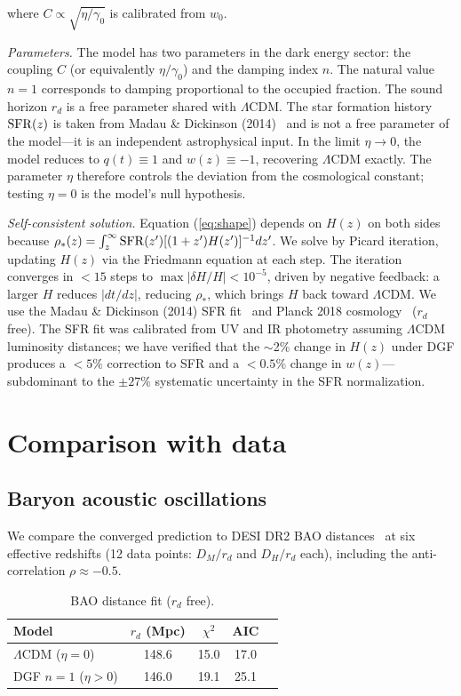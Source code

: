\documentclass[12pt,a4paper]{article}
\begin{document}
where $C\propto\sqrt{\eta/\gamma_0}$ is calibrated from $w_0$.

{\it Parameters.} The model has two parameters in the dark energy sector: the coupling $C$ (or equivalently $\eta/\gamma_0$) and the damping index $n$. The natural value $n=1$ corresponds to damping proportional to the occupied fraction. The sound horizon $r_d$ is a free parameter shared with $\Lambda$CDM. The star formation history ${\rm SFR}(z)$ is taken from Madau \& Dickinson (2014)~\cite{madau2014} and is not a free parameter of the model---it is an independent astrophysical input. In the limit $\eta\to0$, the model reduces to $q(t)\equiv1$ and $w(z)\equiv-1$, recovering $\Lambda$CDM exactly. The parameter $\eta$ therefore controls the deviation from the cosmological constant; testing $\eta=0$ is the model's null hypothesis.

{\it Self-consistent solution.} Equation (\ref{eq:shape}) depends on $H(z)$ on both sides because $\rho_*(z)=\int_z^\infty{\rm SFR}(z')[(1+z')H(z')]^{-1}dz'$. We solve by Picard iteration, updating $H(z)$ via the Friedmann equation at each step. The iteration converges in $<15$ steps to $\max|\delta H/H|<10^{-5}$, driven by negative feedback: a larger $H$ reduces $|dt/dz|$, reducing $\rho_*$, which brings $H$ back toward $\Lambda$CDM. We use the Madau \& Dickinson (2014) SFR fit~\cite{madau2014} and Planck 2018 cosmology~\cite{planck2018} ($r_d$ free). The SFR fit was calibrated from UV and IR photometry assuming $\Lambda$CDM luminosity distances; we have verified that the $\sim$2\% change in $H(z)$ under DGF produces a $<5\%$ correction to SFR and a $<0.5\%$ change in $w(z)$---subdominant to the $\pm27\%$ systematic uncertainty in the SFR normalization.

\section*{Comparison with data}

\subsection*{Baryon acoustic oscillations}

We compare the converged prediction to DESI DR2 BAO distances~\cite{desi2025} at six effective redshifts (12 data points: $D_M/r_d$ and $D_H/r_d$ each), including the anti-correlation $\rho\approx-0.5$.

\begin{table}[htbp]
\centering
\caption{BAO distance fit ($r_d$ free).}
\label{tab:bao}
\begin{tabular}{lcccc}
\toprule
Model & $r_d$ (Mpc) & $\chi^2$ & AIC \\
\midrule
$\Lambda$CDM ($\eta=0$) & 148.6 & 15.0 & 17.0 \\
DGF $n=1$ ($\eta>0$)   & 146.0 & 19.1 & 25.1 \\
\bottomrule
\end{tabular}
\end{table}
\end{document}
